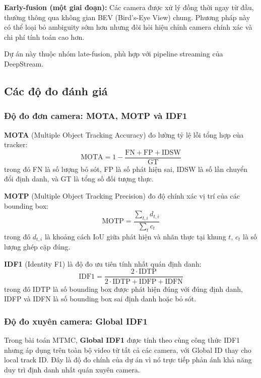 \documentclass{article} %
\begin{document}
\textbf{Early-fusion (một giai đoạn):} Các camera được xử lý đồng thời ngay từ đầu, thường thông qua không gian BEV (Bird's-Eye View) chung. Phương pháp này có thể loại bỏ ambiguity sớm hơn nhưng đòi hỏi hiệu chỉnh camera chính xác và chi phí tính toán cao hơn.

Dự án này thuộc nhóm late-fusion, phù hợp với pipeline streaming của DeepStream.

\subsection{Các độ đo đánh giá}

\subsubsection{Độ đo đơn camera: MOTA, MOTP và IDF1}

\textbf{MOTA} (Multiple Object Tracking Accuracy) đo lường tỷ lệ lỗi tổng hợp của tracker:
\begin{equation}
    \text{MOTA} = 1 - \frac{\text{FN} + \text{FP} + \text{IDSW}}{\text{GT}}
\end{equation}
trong đó FN là số lượng bỏ sót, FP là số phát hiện sai, IDSW là số lần chuyển đổi định danh, và GT là tổng số đối tượng thực.

\textbf{MOTP} (Multiple Object Tracking Precision) đo độ chính xác vị trí của các bounding box:
\begin{equation}
    \text{MOTP} = \frac{\sum_{t,i} d_{t,i}}{\sum_t c_t}
\end{equation}
trong đó $d_{t,i}$ là khoảng cách IoU giữa phát hiện và nhãn thực tại khung $t$, $c_t$ là số lượng ghép cặp đúng.

\textbf{IDF1} (Identity F1) là độ đo ưu tiên tính nhất quán định danh:
\begin{equation}
    \text{IDF1} = \frac{2 \cdot \text{IDTP}}{2 \cdot \text{IDTP} + \text{IDFP} + \text{IDFN}}
\end{equation}
trong đó IDTP là số bounding box được phát hiện đúng với đúng định danh, IDFP và IDFN là số bounding box sai định danh hoặc bỏ sót.

\subsubsection{Độ đo xuyên camera: Global IDF1}

Trong bài toán MTMC, \textbf{Global IDF1} được tính theo cùng công thức IDF1 nhưng áp dụng trên toàn bộ video từ tất cả các camera, với Global ID thay cho local track ID. Đây là độ đo chính của dự án vì nó trực tiếp phản ánh khả năng duy trì định danh nhất quán xuyên camera.
\end{document}
